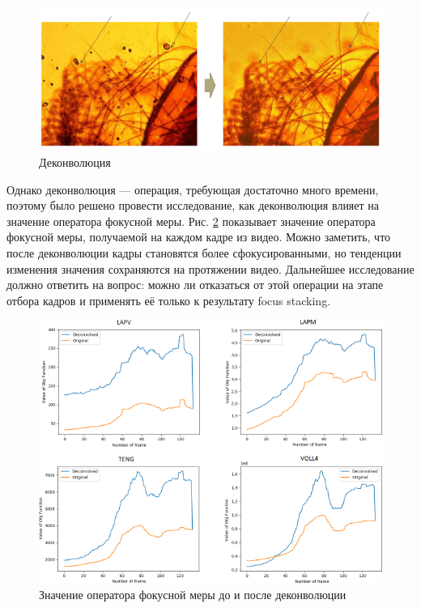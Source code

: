 \documentclass[14pt]{matmex-diploma-custom}
\begin{document}
\begin{figure}[h]
    \centering
    \includegraphics[width=.95\textwidth]{figures/deconvolution1.png}
    \caption{Деконволюция}
    \label{deconvolution1}
\end{figure}

\newpage
Однако деконволюция --- операция, требующая достаточно много времени, поэтому было решено провести исследование, как деконволюция влияет на значение оператора фокусной меры. Рис. \ref{deconvolution2} показывает значение оператора фокусной меры, получаемой на каждом кадре из видео. Можно заметить, что после деконволюции кадры становятся более сфокусированными, но тенденции изменения значения сохраняются на протяжении видео. Дальнейшее исследование должно ответить на вопрос: можно ли отказаться от этой операции на этапе отбора кадров и применять её  только к результату focus stacking.

\begin{figure}[h]
    \centering
    \includegraphics[width=1.0\textwidth]{figures/deconvolution2.png}
    \caption{Значение оператора фокусной меры до и после деконволюции}
    \label{deconvolution2}
\end{figure}
\end{document}
